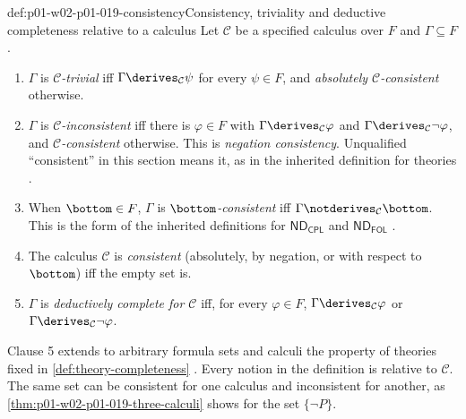 \begin{hbdefinition}{def:p01-w02-p01-019-consistency}{Consistency, triviality and deductive completeness relative to a calculus}
Let \(\mathcal C\) be a specified calculus over \(F\) and
\(\Gamma\subseteq F\).
\begin{enumerate}
  \item \(\Gamma\) is \emph{\(\mathcal C\)-trivial} iff
        \(\Gamma\derives_{\mathcal C}\psi\) for every \(\psi\in F\), and
        \emph{absolutely \(\mathcal C\)-consistent} otherwise.
  \item \(\Gamma\) is \emph{\(\mathcal C\)-inconsistent} iff there is
        \(\varphi\in F\) with \(\Gamma\derives_{\mathcal C}\varphi\) and
        \(\Gamma\derives_{\mathcal C}\neg\varphi\), and
        \emph{\(\mathcal C\)-consistent} otherwise. This is
        \emph{negation consistency}. Unqualified ``consistent'' in this
        section means it, as in the inherited definition for theories
        \cite[ch.~``Diagonalization and the First Incompleteness Theorem'',
        definition ``Consistency'']{FrozenFormalLogicConsistencyComparison}.
  \item When \(\bottom\in F\), \(\Gamma\) is
        \emph{\(\bottom\)-consistent} iff
        \(\Gamma\notderives_{\mathcal C}\bottom\). This is the form of the
        inherited definitions for \(\mathsf{ND}_{\mathsf{CPL}}\) and
        \(\mathsf{ND}_{\mathsf{FOL}}\) \cite[ch.~``Soundness, Completeness,
        Compactness, and Resolution'', definition ``Consistency''; ch.~``Henkin
        Completeness and Compactness'', definition ``First-order
        consistency'']{FrozenFormalLogicConsistencyComparison}.
  \item The calculus \(\mathcal C\) is \emph{consistent} (absolutely, by
        negation, or with respect to \(\bottom\)) iff the empty set is.
  \item \(\Gamma\) is \emph{deductively complete for \(\mathcal C\)} iff,
        for every \(\varphi\in F\), \(\Gamma\derives_{\mathcal C}\varphi\) or
        \(\Gamma\derives_{\mathcal C}\neg\varphi\).
\end{enumerate}
\end{hbdefinition}

Clause 5 extends to arbitrary formula sets and calculi the property of
theories fixed in \cref{def:theory-completeness}
\cite[ch.~``Quantifier Elimination and Categoricity'', definition
``Deductive completeness, semantic completeness, and model
completeness'']{FrozenFormalLogicConsistencyComparison}. Every notion in the
definition is relative to \(\mathcal C\). The same set can be consistent for
one calculus and inconsistent for another, as \cref{thm:p01-w02-p01-019-three-calculi}
shows for the set \(\{\neg P\}\).

